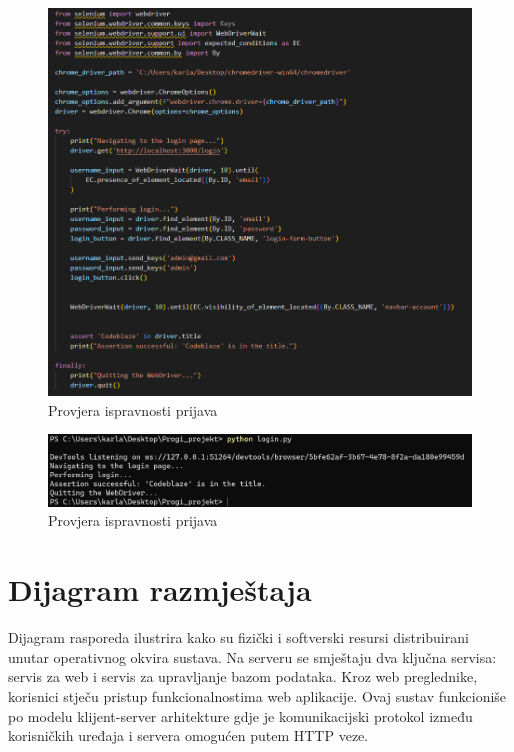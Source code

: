 				\begin{figure} [H]
					\centering
					\includegraphics[width=0.7\linewidth]{slike/LoginSelenium.png}
					\caption{Provjera ispravnosti prijava}
					\label{fig:Provjera ispravnosti prijava}
				\end{figure}
				\begin{figure} [H]
					\centering
					\includegraphics[width=0.7\linewidth]{slike/LoginSeleniumOutput.png}
					\caption{Provjera ispravnosti prijava}
					\label{fig:Provjera ispravnosti prijava}
				\end{figure}
                                  




			
			\eject 
		
		
		\section{Dijagram razmještaja}
			
			Dijagram rasporeda ilustrira kako su fizički i softverski resursi distribuirani unutar operativnog okvira sustava. Na serveru se smještaju dva ključna servisa: servis za web i servis za upravljanje bazom podataka. Kroz web preglednike, korisnici stječu pristup funkcionalnostima web aplikacije. Ovaj sustav funkcioniše po modelu klijent-server arhitekture gdje je komunikacijski protokol između korisničkih uređaja i servera omogućen putem HTTP veze.

